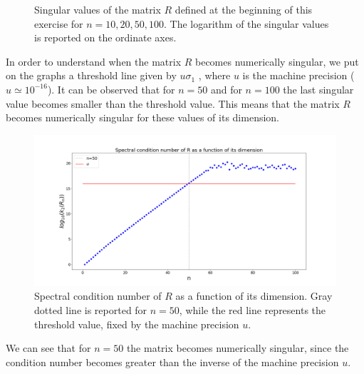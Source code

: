 \documentclass[a4paper,11pt]{article}
\begin{document}
\begin{figure}[H]
	
	\caption{Singular values of the matrix $R$ defined at the beginning of this exercise for $n=10,20,50,100$. The logarithm of the singular values is reported on the ordinate axes.}
	\label{fig:Singular_values_of_R_for_different_dimensions}
\end{figure}

\noindent In order to understand when the matrix $R$ becomes numerically singular, we put on the graphs a threshold line given by $u\sigma_{1}$ , where $u$ is the machine precision ($u \simeq 10^{-16}$). It can be observed that for $n=50$ and for $n=100$ the last singular value becomes smaller than the threshold value. This means that the matrix $R$ becomes numerically singular for these values of its dimension.
\begin{figure}[H]
	\centering
	\includegraphics[scale=0.25]{Plot/Spectral_cond_num_R}
	\caption{Spectral condition number of $R$ as a function of its dimension. Gray dotted line is reported for $n=50$, while the red line represents the threshold value, fixed by the machine precision $u$.}
	\label{fig:Spectral_cond_num_R}
\end{figure}
\noindent We can see that for $n=50$ the matrix becomes numerically singular, since the condition number becomes greater than the inverse of the machine precision $u$.\\
\end{document}

